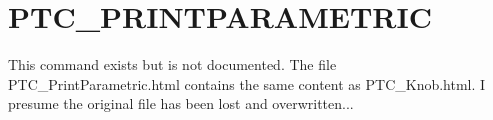 
\section{PTC\_PRINTPARAMETRIC}

This command exists but is not documented. The file
PTC\_PrintParametric.html contains the same content as PTC\_Knob.html. I
presume the original file has been lost and overwritten...

